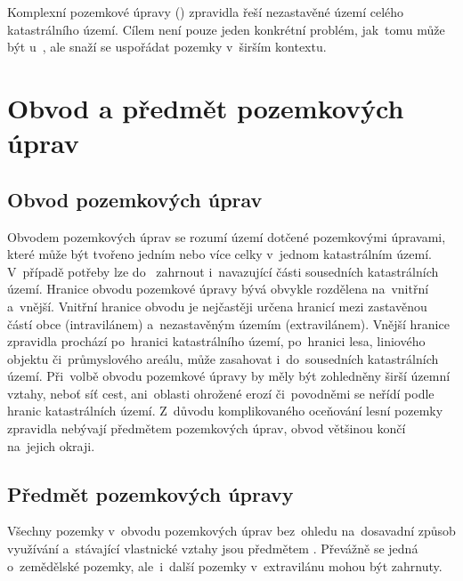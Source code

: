 Komplexní pozemkové úpravy () zpravidla řeší nezastavěné
území celého kata\-strálního území. Cílem  není pouze jeden
konkrétní problém, jak~tomu může být u~, ale snaží se
uspořádat pozemky v~širším kontextu.

\section{Obvod a předmět pozemkových úprav}
\label{obvod_a_predmet_pu}

\subsection{Obvod pozemkových úprav}
\label{obvod_pu}

Obvodem pozemkových úprav se rozumí území dotčené pozemkovými
úpra\-vami, které může být tvořeno jedním nebo více celky v~jednom
katastrálním území. V~pří\-padě potřeby lze do~ zahrnout
i~navazující části sousedních katastrálních území. Hranice obvodu
pozemkové úpravy bývá obvykle rozdělena na~vnitřní a~vnější. Vnitřní
hranice obvodu je nejčastěji určena hranicí mezi zastavěnou částí obce
(intravilánem) a~nezastavěným územím (extravilánem). Vnější hranice
zpravidla pro\-chází po~hranici katastrálního území, po~hranici lesa,
liniového objektu či~průmy\-slového areálu, může zasahovat
i~do~sousedních katastrálních území. Při~volbě obvodu pozemkové úpravy
by měly být zohledněny širší územní vztahy, neboť síť cest,
ani~oblasti ohrožené erozí či~povodněmi se neřídí podle hranic
katastrálních území. Z~důvodu komplikovaného oceňování lesní pozemky
zpravidla nebývají předmětem pozemkových úprav, obvod většinou končí
na~jejich okraji.

\subsection{Předmět pozemkových úpravy}
\label{predmet_pu}

Všechny pozemky v~obvodu pozemkových úprav bez~ohledu na~dosavadní
způsob využívání a~stávající vlastnické vztahy jsou předmětem
. Převážně se jedná o~zemědělské pozemky, ale~i~další pozemky
v~extravilánu mohou být zahrnuty.

